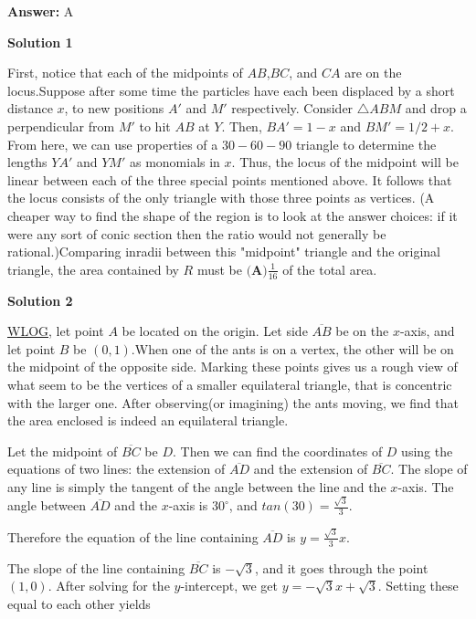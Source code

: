 \begin{enumerate}
 \textbf{Answer: }A



\textbf{Solution 1}

First, notice that each of the midpoints of $AB$,$BC$, and $CA$ are on the locus.Suppose after some time the particles have each been displaced by a short distance $x$, to new positions $A'$ and $M'$ respectively. Consider $\triangle ABM$ and drop a perpendicular from $M'$ to hit $AB$ at $Y$. Then, $BA'=1-x$ and $BM'=1/2+x$. From here, we can use properties of a $30-60-90$ triangle to determine the lengths $YA'$ and $YM'$ as monomials in $x$. Thus, the locus of the midpoint will be linear between each of the three special points mentioned above. It follows that the locus consists of the only triangle with those three points as vertices. (A cheaper way to find the shape of the region is to look at the answer choices: if it were any sort of conic section then the ratio would not generally be rational.)Comparing inradii between this "midpoint" triangle and the original triangle, the area contained by $R$ must be $\textbf{(A)} \frac{1}{16}$ of the total area.

 


 



\textbf{Solution 2}

\href{https://artofproblemsolving.com/wiki/index.php?title=WLOG}{WLOG}, let point $A$ be located on the origin. Let side $\overline{AB}$ be on the $x$-axis, and let point $B$ be $(0, 1)$.When one of the ants is on a vertex, the other will be on the midpoint of the opposite side. Marking these points gives us a rough view of what seem to be the vertices of a smaller equilateral triangle, that is concentric with the larger one. After observing(or imagining) the ants moving, we find that the area enclosed is indeed an equilateral triangle.

 Let the midpoint of $\overline{BC}$ be $D$. Then we can find the coordinates of $D$ using the equations of two lines: the extension of $\overline{AD}$ and the extension of $\overline{BC}$. The slope of any line is simply the tangent of the angle between the line and the $x$-axis. The angle between $\overline{AD}$ and the $x$-axis is $30^{\circ}$, and $tan(30) = \frac{\sqrt{3}}{3}$.

 Therefore the equation of the line containing $\overline{AD}$ is $y= \frac{\sqrt{3}}{3}x.$

 The slope of the line containing $\overline{BC}$ is $-\sqrt{3}$, and it goes through the point $(1, 0)$. After solving for the $y$-intercept, we get $y = -\sqrt{3}x+\sqrt{3}$. Setting these equal to each other yields


\end{enumerate}
